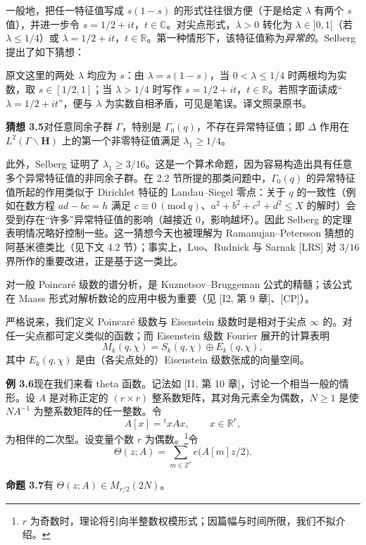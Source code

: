 一般地，把任一特征值写成 $s(1-s)$ 的形式往往很方便（于是给定 $\lambda$ 有两个 $s$ 值），并进一步令 $s=1/2+it$，$t\in\mathbb{C}$。对尖点形式，$\lambda>0$ 转化为 $\lambda\in]0,1[$（若 $\lambda\le1/4$）或 $\lambda=1/2+it$，$t\in\mathbb{R}$。第一种情形下，该特征值称为\emph{异常的}。Selberg 提出了如下猜想：

\begin{annote}
原文这里的两处 $\lambda$ 均应为 $s$：由 $\lambda=s(1-s)$，当 $0<\lambda\le1/4$ 时两根均为实数，取 $s\in[1/2,1]$；当 $\lambda>1/4$ 时写作 $s=1/2+it$，$t\in\mathbb{R}$。若照字面读成“$\lambda=1/2+it$”，便与 $\lambda$ 为实数自相矛盾，可见是笔误。译文照录原书。
\par\vspace{0.15em}{\raggedleft 【来源：原书 §3（A）；Iwaniec《Introduction to the Spectral Theory of Automorphic Forms》第 11 章（A）】\par}
\end{annote}

\par\medskip\noindent\textbf{猜想 3.5}\quad 对任意同余子群 $\Gamma$，特别是 $\Gamma_{0}(q)$，不存在异常特征值；即 $\Delta$ 作用在 $L^{2}(\Gamma\backslash\mathbf{H})$ 上的第一个非零特征值满足 $\lambda_{1}\ge1/4$。

此外，Selberg 证明了 $\lambda_{1}\ge3/16$。这是一个算术命题，因为容易构造出具有任意多个异常特征值的非同余子群。在 2.2 节所提的那类问题中，$\Gamma_{0}(q)$ 的异常特征值所起的作用类似于 Dirichlet 特征的 Landau--Siegel 零点：关于 $q$ 的一致性（例如在数方程 $ad-bc=h$ 满足 $c\equiv0\ (\mathrm{mod}\ q)$、$a^{2}+b^{2}+c^{2}+d^{2}\le X$ 的解时）会受到存在“许多”异常特征值的影响（越接近 $0$，影响越坏）。因此 Selberg 的定理表明情况略好控制一些。这一猜想今天也被理解为 Ramanujan--Petersson 猜想的阿基米德类比（见下文 4.2 节）；事实上，Luo、Rudnick 与 Sarnak [LRS] 对 $3/16$ 界所作的重要改进，正是基于这一类比。

对一般 Poincaré 级数的谱分析，是 Kuznetsov--Bruggeman 公式的精髓；该公式在 Maass 形式对解析数论的应用中极为重要（见 [I2, 第 9 章]、[CP]）。

严格说来，我们定义 Poincaré 级数与 Eisenstein 级数时是相对于尖点 $\infty$ 的。对任一尖点都可定义类似的函数；而 Eisenstein 级数 Fourier 展开的计算表明
\[
M_{k}(q,\chi)=S_{k}(q,\chi)\oplus E_{k}(q,\chi),
\]
其中 $E_{k}(q,\chi)$ 是由（各尖点处的）Eisenstein 级数张成的向量空间。

\par\medskip\noindent\textbf{例 3.6}\quad 现在我们来看 theta 函数。记法如 [I1, 第 10 章]，讨论一个相当一般的情形。设 $A$ 是对称正定的 $(r\times r)$ 整系数矩阵，其对角元素全为偶数，$N\ge1$ 是使 $NA^{-1}$ 为整系数矩阵的任一整数。令
\[
A[x]={}^{t}xAx,\qquad x\in\mathbb{R}^{r},
\]
为相伴的二次型。设变量个数 $r$ 为偶数。\footnote{$r$ 为奇数时，理论将引向半整数权模形式；因篇幅与时间所限，我们不拟介绍。}令
\[
\Theta(z;A)=\sum_{m\in\mathbb{Z}^{r}}e\bigl(A[m]z/2\bigr).
\]
\par\medskip\noindent\textbf{命题 3.7}\quad 有 $\Theta(z;A)\in M_{r/2}(2N)$。

